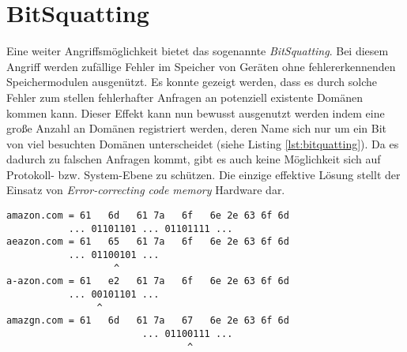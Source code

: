 \section{BitSquatting}
Eine weiter Angriffsmöglichkeit bietet das sogenannte \textit{BitSquatting}. Bei diesem Angriff werden zufällige Fehler im Speicher von Geräten ohne fehlererkennenden Speichermodulen ausgenützt. Es konnte gezeigt werden, dass es durch solche Fehler zum stellen fehlerhafter Anfragen an potenziell existente Domänen kommen kann\cite{Dinaburg2011}. Dieser Effekt kann nun bewusst ausgenutzt werden indem eine große Anzahl an Domänen registriert werden, deren Name sich nur um ein Bit von viel besuchten Domänen unterscheidet (siehe Listing \ref{lst:bitquatting}). Da es dadurch zu falschen Anfragen kommt, gibt es auch keine Möglichkeit sich auf Protokoll- bzw. System-Ebene zu schützen. Die einzige effektive Lösung stellt der Einsatz von \textit{Error-correcting code memory} Hardware dar.  
\begin{lstlisting}[caption={Drei mögliche BitSquatting-Domänen für die Zieldomäne \texttt{amazon.com}}, label={lst:bitquatting}]
amazon.com = 61   6d   61 7a   6f   6e 2e 63 6f 6d
           ... 01101101 ... 01101111 ... 
aeazon.com = 61   65   61 7a   6f   6e 2e 63 6f 6d  
           ... 01100101 ...
                   ^
a-azon.com = 61   e2   61 7a   6f   6e 2e 63 6f 6d 
           ... 00101101 ...
                ^
amazgn.com = 61   6d   61 7a   67   6e 2e 63 6f 6d
                        ... 01100111 ...
                                ^
\end{lstlisting}
